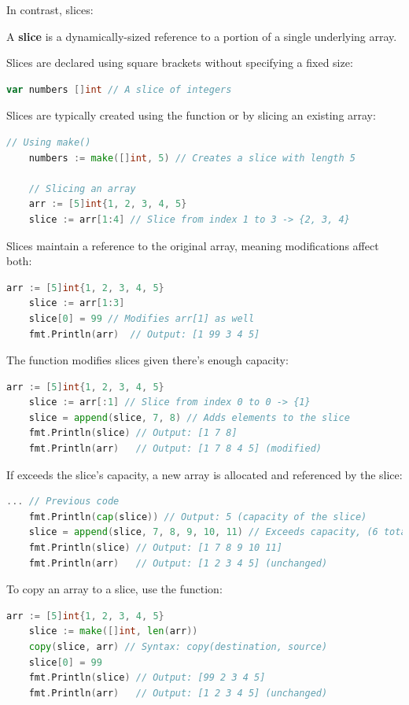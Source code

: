\newpage
    
\noindent
In contrast, slices:

\begin{Def}[Slices in Go]
    
    A \textbf{slice} is a dynamically-sized reference to a portion of a single underlying array.

    \noindent
    Slices are declared using square brackets without specifying a fixed size:
    \begin{lstlisting}[language=Go]
    var numbers []int // A slice of integers
    \end{lstlisting}
    
    \noindent
    Slices are typically created using the  function or by slicing an existing array:
    \begin{lstlisting}[language=Go]
    // Using make()
    numbers := make([]int, 5) // Creates a slice with length 5
    
    // Slicing an array
    arr := [5]int{1, 2, 3, 4, 5}
    slice := arr[1:4] // Slice from index 1 to 3 -> {2, 3, 4}
    \end{lstlisting}
    
    \noindent
    Slices maintain a reference to the original array, meaning modifications affect both:
    \begin{lstlisting}[language=Go]
    arr := [5]int{1, 2, 3, 4, 5}
    slice := arr[1:3]
    slice[0] = 99 // Modifies arr[1] as well
    fmt.Println(arr)  // Output: [1 99 3 4 5]
    \end{lstlisting}

    \noindent
    The  function modifies slices given there's enough capacity:
    \begin{lstlisting}[language=Go]
    arr := [5]int{1, 2, 3, 4, 5}
    slice := arr[:1] // Slice from index 0 to 0 -> {1}
    slice = append(slice, 7, 8) // Adds elements to the slice
    fmt.Println(slice) // Output: [1 7 8]
    fmt.Println(arr)   // Output: [1 7 8 4 5] (modified)
    \end{lstlisting}

    \noindent
    If  exceeds the slice's capacity, a new array is allocated and referenced by the slice:
    \begin{lstlisting}[language=Go]
    ... // Previous code
    fmt.Println(cap(slice)) // Output: 5 (capacity of the slice)
    slice = append(slice, 7, 8, 9, 10, 11) // Exceeds capacity, (6 total)
    fmt.Println(slice) // Output: [1 7 8 9 10 11]
    fmt.Println(arr)   // Output: [1 2 3 4 5] (unchanged)
    \end{lstlisting}

    \noindent
    To copy an array to a slice, use the  function:
    \begin{lstlisting}[language=Go]
    arr := [5]int{1, 2, 3, 4, 5}
    slice := make([]int, len(arr))
    copy(slice, arr) // Syntax: copy(destination, source)
    slice[0] = 99
    fmt.Println(slice) // Output: [99 2 3 4 5]
    fmt.Println(arr)   // Output: [1 2 3 4 5] (unchanged)
    \end{lstlisting}
\end{Def}

